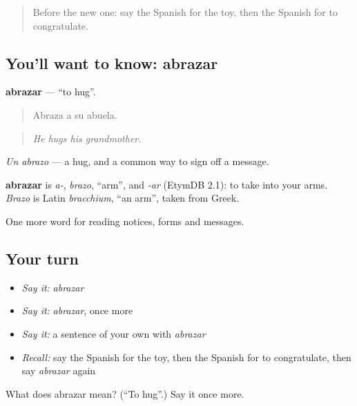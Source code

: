 \begin{quote}
Before the new one: say the Spanish for the toy, then the Spanish for to congratulate.
\end{quote}

\subsection*{You'll want to know: abrazar}
\textbf{abrazar} — \textquotedblleft{}to hug\textquotedblright{}.

\begin{quote}
Abraza a su abuela.
\end{quote}

\begin{quote}
\emph{He hugs his grandmother.}
\end{quote}

\emph{Un abrazo} — a hug, and a common way to sign off a message.

\begin{cousinweb}
\textbf{abrazar} is \emph{a-}, \emph{brazo}, \textquotedblleft{}arm\textquotedblright{}, and \emph{-ar} (EtymDB 2.1): to take into your arms. \emph{Brazo} is Latin \emph{bracchium}, \textquotedblleft{}an arm\textquotedblright{}, taken from Greek.
\end{cousinweb}

\begin{grammarlens}[title={What you've built}]
One more word for reading notices, forms and messages.
\end{grammarlens}

\subsection*{Your turn}
\begin{itemize}
\raggedright
  \item \emph{Say it:} \emph{abrazar}
  \item \emph{Say it:} \emph{abrazar}, once more
  \item \emph{Say it:} a sentence of your own with \emph{abrazar}
  \item \emph{Recall:} say the Spanish for the toy, then the Spanish for to congratulate, then say \emph{abrazar} again
\end{itemize}

\begin{tcolorbox}[breakable,colback=teal!4,colframe=teal!35!black,title={Before you move on}]
What does abrazar mean? (\textquotedblleft{}To hug\textquotedblright{}.) Say it once more.
\end{tcolorbox}
